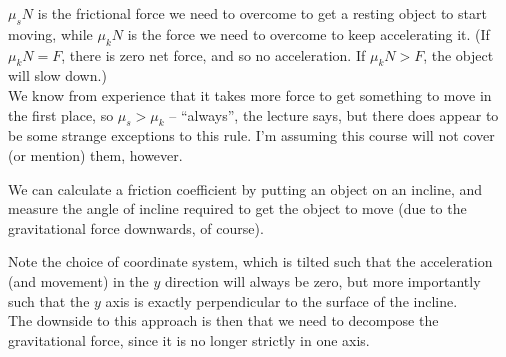 $\mu_s N$ is the frictional force we need to overcome to get a resting object to start moving, while $\mu_k N$ is the force we need to overcome to keep accelerating it. (If $\mu_k N = F$, there is zero net force, and so no acceleration. If $\mu_k N > F$, the object will slow down.)\\
We know from experience that it takes more force to get something to move in the first place, so $\mu_s > \mu_k$ -- ``always'', the lecture says, but there does appear to be some strange exceptions to this rule. I'm assuming this course will not cover (or mention) them, however.

We can calculate a friction coefficient by putting an object on an incline, and measure the angle of incline required to get the object to move (due to the gravitational force downwards, of course).

\begin{figure}[H]
  \centering
{}
\end{figure}


Note the choice of coordinate system, which is tilted such that the acceleration (and movement) in the $y$ direction will always be zero, but more importantly such that the $y$ axis is exactly perpendicular to the surface of the incline.\\
The downside to this approach is then that we need to decompose the gravitational force, since it is no longer strictly in one axis.

